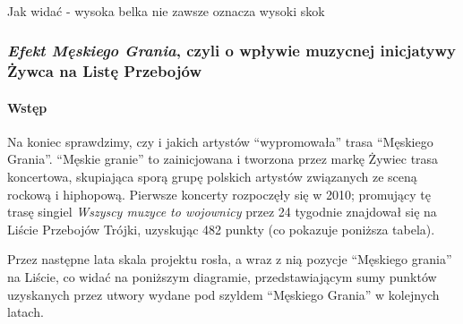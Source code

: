 \documentclass[11pt]{article}
\begin{document}
    \begin{center}
    \end{center}
    { \hspace*{\fill} \\}
    
    Jak widać - wysoka belka nie zawsze oznacza wysoki skok

    \hypertarget{efekt-mux119skiego-grania-czyli-o-wpux142ywie-muzycnej-inicjatywy-ux17cywca-na-listux119-przebojuxf3w}{%
\subsubsection{\texorpdfstring{\emph{Efekt Męskiego Grania}, czyli o
wpływie muzycnej inicjatywy Żywca na Listę
Przebojów}{Efekt Męskiego Grania, czyli o wpływie muzycnej inicjatywy Żywca na Listę Przebojów}}\label{efekt-mux119skiego-grania-czyli-o-wpux142ywie-muzycnej-inicjatywy-ux17cywca-na-listux119-przebojuxf3w}}

\hypertarget{wstux119p}{%
\paragraph{Wstęp}\label{wstux119p}}

Na koniec sprawdzimy, czy i jakich artystów ``wypromowała'' trasa
``Męskiego Grania''. ``Męskie granie'' to zainicjowana i tworzona przez
markę Żywiec trasa koncertowa, skupiająca sporą grupę polskich artystów
związanych ze sceną rockową i hiphopową. Pierwsze koncerty rozpoczęły
się w 2010; promujący tę trasę singiel \emph{Wszyscy muzyce to
wojownicy} przez 24 tygodnie znajdował się na Liście Przebojów Trójki,
uzyskując 482 punkty (co pokazuje poniższa tabela).

Przez następne lata skala projektu rosła, a wraz z nią pozycje
``Męskiego grania'' na Liście, co widać na poniższym diagramie,
przedstawiającym sumy punktów uzyskanych przez utwory wydane pod szyldem
``Męskiego Grania'' w kolejnych latach.
\end{document}
